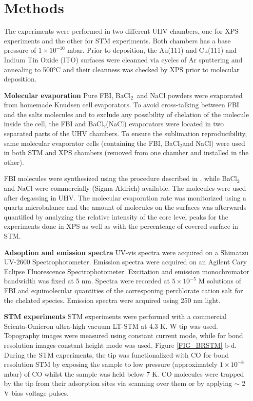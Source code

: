 \documentclass[aps,prl,reprint,longbibliography,superscriptaddress, english]{revtex4-1}
\def\BappCl{BaCl$_2$}
\begin{document}
\section{Methods}
The experiments were performed in two different UHV chambers, one for XPS experiments and the other for STM experiments. Both chambers has a base pressure of $1\times10^{-10}$ mbar. Prior to deposition, the Au(111) and Cu(111) and Indium Tin Oxide (ITO) surfaces were cleanned via cycles of Ar sputtering and annealing to 500°C and their cleanness was checked by XPS prior to molecular deposition. 

\textbf{Molecular evaporation}
Pure FBI, \BappCl\ and NaCl powders were evaporated from homemade Knudsen cell evaporators. To avoid cross-talking between FBI and the salts molecules and to exclude any possibility of chelation of the molecule inside the cell, the FBI and \BappCl (NaCl) evaporators were located in two separated parts of the UHV chambers. To ensure the sublimation reproducibility, same molecular evaporator cells (containing the FBI, \BappCl and NaCl) were used in both STM and XPS chambers (removed from one chamber and installed in the other).  

FBI molecules were synthesized using the procedure described in \cite{rivilla_fluorescent_2020}, while \BappCl and NaCl were commercially (Sigma-Aldrich) available. The molecules were used after degassing in UHV.
The molecular evaporation rate was monitorized using a quartz microbalance and the amount of molecules on the surfaces was afterwards quantified by analyzing the relative intensity of the core level peaks for the experiments done in XPS as well as with the percenteage of covered surface in STM. 

\textbf{Adsoption and emission spectra}
 UV-vis spectra were acquired on a Shimatzu UV-2600 Spectrophotometer. Emission spectra were acquired on an Agilent Cary Eclipse Fluorescence Spectrophotometer. Excitation and emission monochromator bandwidth was fixed at 5 nm. Spectra were recorded at $5\times10^{-5}$ M solutions of FBI and equimolecular quantities of the corresponing perchlorate cation salt for the chelated species. Emission spectra were acquired using 250 nm light.

\textbf{STM experiments}
STM experiments were performed with a commercial Scienta-Omicron ultra-high vacuum LT-STM at 4.3 K. W tip  was used. Topography images were measured using constant current mode, while for bond resolution images constant height mode was used, Figure \ref{FIG_BRSTM} b-d. During the STM experiments, the tip was functionalized with CO for bond resolution STM by exposing the sample to low pressure (approximately $1 \times 10^{-8}$ mbar) of CO whilst the sample was held below 7 K. CO molecules were trapped by the tip from their adsorption sites via scanning over them or by applying $\sim$ 2 V bias voltage pulses. 
\end{document}
